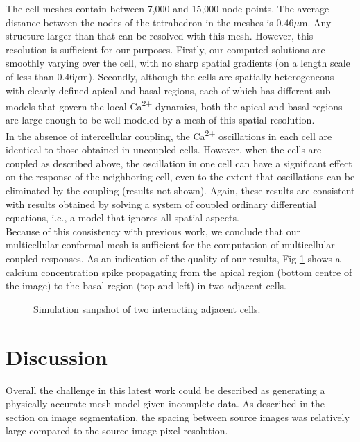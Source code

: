 \documentclass[10pt,letterpaper]{article}
\begin{document}
The cell meshes contain between 7,000 and 15,000 node points. The average distance between the nodes of the tetrahedron in the meshes is $0.46 \mu\mathrm{m}$. Any structure larger than that can be resolved with this mesh. However, this resolution is sufficient for our purposes. Firstly, our computed solutions are smoothly varying over the cell, with no sharp spatial gradients (on a length scale of less than $0.46 \mu\mathrm{m}$). Secondly, although the cells are spatially heterogeneous with clearly defined apical and basal regions, each of which has different sub-models that govern the local Ca\textsuperscript{2+} dynamics, both the apical and basal regions are large enough to be well modeled by a mesh of this spatial resolution.​\\

In the absence of intercellular coupling, the Ca\textsuperscript{2+} oscillations in each cell are identical to those obtained in uncoupled cells. However, when the cells are coupled as described above, the oscillation in one cell can have a significant effect on the response of the neighboring cell, even to the extent that oscillations can be eliminated by the coupling (results not shown). Again, these results are consistent with results obtained by solving a system of coupled ordinary differential equations, i.e., a model that ignores all spatial aspects.\\

Because of this consistency with previous work, we conclude that our multicellular conformal mesh is sufficient for the computation of multicellular coupled responses.
As an indication of the quality of our results, Fig \ref{fig:two_cells} shows a calcium concentration spike propagating from the apical region (bottom centre of the image) to the basal region (top and left) in two adjacent cells.\\ 

\begin{figure}[h!]
\caption{Simulation sanpshot of two interacting adjacent cells.}
\label{fig:two_cells}
\end{figure}

\section*{Discussion}

Overall the challenge in this latest work could be described as generating a physically accurate mesh model given incomplete data. As described in the section on image segmentation, the spacing between source images was relatively large compared to the source image pixel resolution.\\
\end{document}
